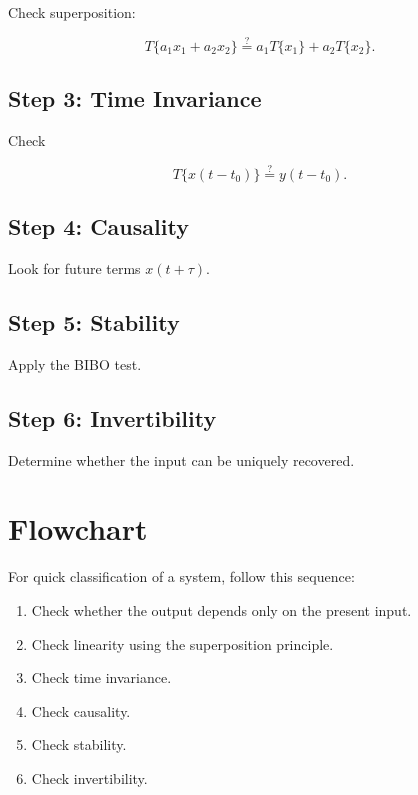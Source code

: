 Check superposition:

\[
T\{a_1x_1+a_2x_2\}
\stackrel{?}{=}
a_1T\{x_1\}+a_2T\{x_2\}.
\]


\subsection{Step 3: Time Invariance}

Check

\[
T\{x(t-t_0)\}
\stackrel{?}{=}
y(t-t_0).
\]


\subsection{Step 4: Causality}

Look for future terms \(x(t+\tau)\).


\subsection{Step 5: Stability}

Apply the BIBO test.


\subsection{Step 6: Invertibility}

Determine whether the input can be uniquely recovered.


\section{Flowchart}

For quick classification of a system, follow this sequence:

\begin{enumerate}
\item Check whether the output depends only on the present input.
\item Check linearity using the superposition principle.
\item Check time invariance.
\item Check causality.
\item Check stability.
\item Check invertibility.
\end{enumerate}

